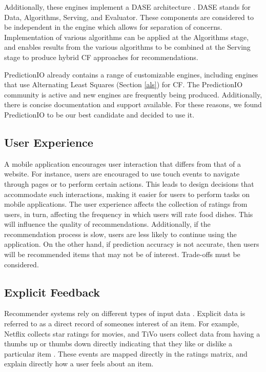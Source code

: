 Additionally, these engines implement a DASE architecture \cite{predictionio}. DASE stands for Data, Algorithms, Serving, and Evaluator. These components are considered to be independent in the engine which allows for separation of concerns. Implementation of various algorithms can be applied at the Algorithms stage, and enables results from the various algorithms to be combined at the Serving stage to produce hybrid CF approaches for recommendations.

PredictionIO already contains a range of customizable engines, including engines that use Alternating Least Squares (Section \ref{als}) for CF. The PredictionIO community is active and new engines are frequently being produced. Additionally, there is concise documentation and support available. For these reasons, we found PredictionIO to be our best candidate and decided to use it. 

\subsection{User Experience}

A mobile application encourages user interaction that differs from that of a website. For instance, users are encouraged to use touch events to navigate through pages or to perform certain actions. This leads to design decisions that accommodate such interactions, making it easier for users to perform tasks on mobile applications. The user experience affects the collection of ratings from users, in turn, affecting the frequency in which users will rate food dishes. This will influence the quality of recommendations. Additionally, if the recommendation process is slow, users are less likely to continue using the application. On the other hand, if prediction accuracy is not accurate, then users will be recommended items that may not be of interest. Trade-offs must be considered.  

\subsection{Explicit Feedback}

Recommender systems rely on different types of input data \cite{koren2009matrix}. Explicit data is referred to as a direct record of someones interest of an item. For example, Netflix collects star ratings for movies, and TiVo users collect data from having a thumbs up or thumbs down directly indicating that they like or dislike a particular item \cite{koren2009matrix}. These events are mapped directly in the ratings matrix, and explain directly how a user feels about an item. 


